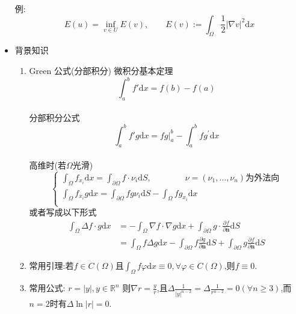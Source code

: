 \documentclass[12pt, a4paper]{ctexbook}
\newcommand{\dx}{\text{d}x}
\newcommand{\dS}{\text{d}S}
\begin{document}
\begin{itemize}
        例:$$E(u) = \mathop{\inf}_{v\in U} E(v), \qquad E(v) := \int_{\Omega} \frac12 | \nabla v |^2 \dx$$
        \item 背景知识
        \begin{enumerate}
            \item Green 公式(分部积分)
            微积分基本定理$$\int_a^bf'\dx = f(b) - f(a)$$ \\
            分部积分公式$$\int_a^bf'g\dx = fg\Big|_a^b - \int_a^bfg^{\prime}\dx$$\\
            高维时(若$\Omega$光滑)
            $$\begin{cases}
            \int_{\Omega} f_{x_i}\dx = \int_{\partial \Omega}f \cdot \nu_i \dS, \qquad\qquad \nu = (\nu_1, \dots, \nu_n) \text{为外法向} \\
            \int_{\Omega} f_{x_i}g\dx = \int_{\partial \Omega}fg\nu_i\dS - \int_{\Omega}fg_{x_i}\dx \\
            \end{cases}$$
            或者写成以下形式
            \begin{align*}
            \int_{\Omega} \Delta f \cdot g \dx &= - \int_{\Omega} \nabla f \cdot \nabla g \dx + \int_{\partial \Omega} g \cdot \frac{\partial f}{\partial \bm{n}} \dS \\
            &= \int_{\Omega} f \Delta g \dx - \int_{\partial \Omega} f \frac{\partial g}{\partial\bm{n}}\dS + \int_{\partial \Omega} g \frac{\partial f}{\partial\bm{n}}\dS
            \end{align*}
            
            \item 常用引理:若$f \in C(\Omega)$且$\int_{\Omega} f \varphi \dx \equiv 0, \forall \varphi \in C(\Omega)$,则$f\equiv0$.
            
            \item 常用公式: $ r = |y|, y \in \mathbb{R}^n $ 则$ \nabla r = \frac{y}{r}$,且$\Delta \frac1{|y|^{n-2}} = \Delta \frac1{r^{n-2}} = 0 (\forall n \geq 3)$,而$n=2$时有$\Delta \ln |r| = 0$.
            

\end{enumerate}
\end{itemize}
\end{document}
